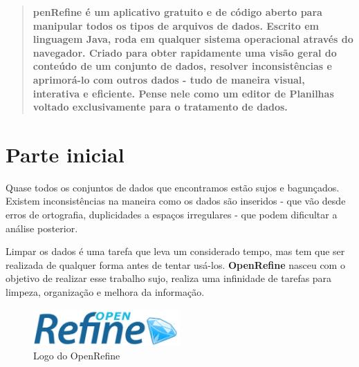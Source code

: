 \documentclass[a4paper,11pt]{article}
\begin{document}
	
\maketitle %
\thispagestyle{fancy} %

\begin{abstract}
  \textbf{penRefine \cite{openrefineoficial} é um aplicativo gratuito e de código aberto para manipular todos os tipos de arquivos de dados. Escrito em linguagem Java, roda em qualquer sistema operacional através do navegador. Criado para obter rapidamente uma visão geral do conteúdo de um conjunto de dados, resolver inconsistências e aprimorá-lo com outros dados - tudo de maneira visual, interativa e eficiente. Pense nele como um editor de Planilhas voltado exclusivamente para o tratamento de dados.}
\end{abstract}

\section{Parte inicial}
Quase todos os conjuntos de dados que encontramos estão sujos e bagunçados. Existem inconsistências na maneira como os dados são inseridos - que vão desde erros de ortografia, duplicidades a espaços irregulares - que podem dificultar a análise posterior.

Limpar os dados é uma tarefa que leva um considerado tempo, mas tem que ser realizada de qualquer forma antes de tentar usá-los. \textbf{OpenRefine} nasceu com o objetivo de realizar esse trabalho sujo, realiza uma infinidade de tarefas para limpeza, organização e melhora da informação.
\begin{figure}[H]
	\centering
	\includegraphics[width=0.5\textwidth]{imagem/logo.jpeg}
	\caption{Logo do OpenRefine}
\end{figure}
\end{document}
